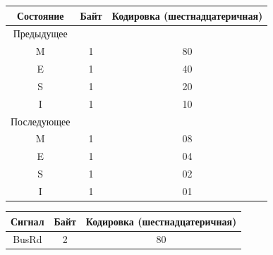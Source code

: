 \begin{table}[b]
\begin{center}
\begin{tabular}{|c|c|c|}
Состояние&Байт&Кодировка (шестнадцатеричная)\\


\hline


Предыдущее &&\\


\hline


M&1&80\\


E&1&40\\


S&1&20\\


I&1&10\\


\hline


Последующее&&\\


\hline


M&1&08\\


E&1&04\\


S&1&02\\


I&1&01\\


\hline


\end{tabular}


\end{center}






      \begin{center}




      \vspace*{2ex}


      


\tabcolsep=9.5pt


      \begin{tabular}{|c|c|c|}


      \hline


Сигнал&Байт&Кодировка (шестнадцатеричная)\\


\hline


BusRd&2&80\\



\end{tabular}
\end{center}
\end{table}
